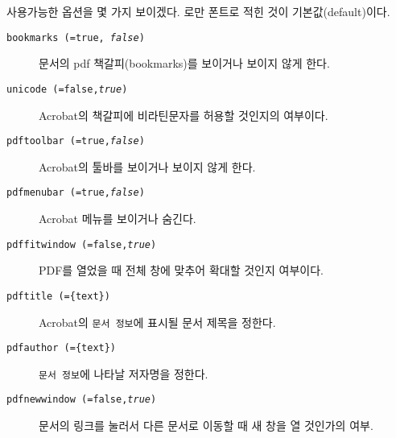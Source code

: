 사용가능한 옵션을 몇 가지 보이겠다. 로만 폰트로 적힌 것이 기본값(default)이다.

\begin{description}
\item [\texttt{bookmarks (=true, \textit{false})}] 문서의 pdf 책갈피(bookmarks)를 보이거나 보이지 않게 한다.
\item [\texttt{unicode (=false,\textit{true})}] Acrobat의 책갈피에 비라틴문자를 허용할 것인지의 여부이다.
\item [\texttt{pdftoolbar (=true,\textit{false})}] Acrobat의 툴바를 보이거나 보이지 않게 한다.
\item [\texttt{pdfmenubar (=true,\textit{false})}] Acrobat 메뉴를 보이거나 숨긴다.
\item [\texttt{pdffitwindow (=false,\textit{true})}] PDF를 열었을 때 전체 창에 맞추어 확대할 것인지 여부이다.
\item [\texttt{pdftitle (=\{text\})}] Acrobat의 \texttt{문서 정보}에 표시될 문서 제목을 정한다.
\item [\texttt{pdfauthor (=\{text\})}] \texttt{문서 정보}에 나타날 저자명을 정한다.
\item [\texttt{pdfnewwindow (=false,\textit{true})}] 문서의 링크를 눌러서 다른 문서로 이동할 때 새 창을 열 것인가의 여부.

\end{description}

